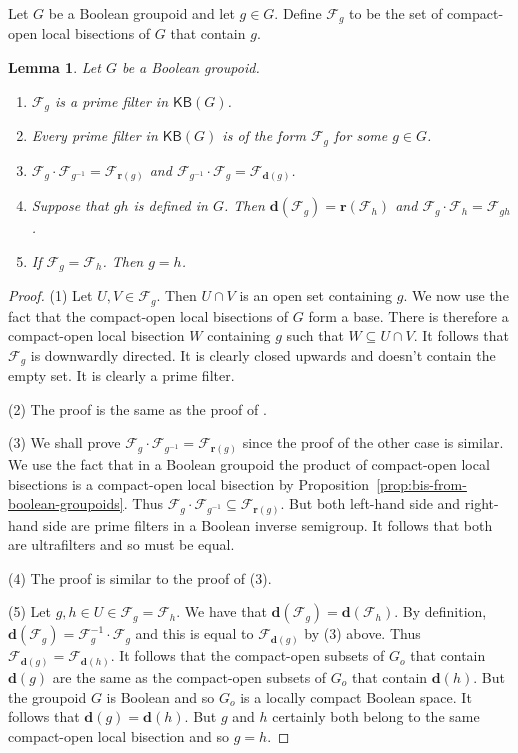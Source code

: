 \documentclass[a4paper]{amsart}
\newtheorem{lemma}[theorem]{Lemma}
\begin{document}
Let $G$ be a Boolean groupoid and let $g \in G$.
Define $\mathscr{F}_{g}$ to be the set of compact-open local bisections of $G$ that contain $g$.


\begin{lemma}\label{lem:compact-open-prime} Let $G$ be a Boolean groupoid.
\begin{enumerate}
\item $\mathscr{F}_{g}$ is a prime filter in $\mathsf{KB}(G)$.
\item Every prime filter in $\mathsf{KB}(G)$ is of the form $\mathscr{F}_{g}$ for some $g \in G$.
\item $\mathscr{F}_{g} \cdot \mathscr{F}_{g^{-1}} = \mathscr{F}_{\mathbf{r}(g)}$
and
$\mathscr{F}_{g^{-1}} \cdot \mathscr{F}_{g} = \mathscr{F}_{\mathbf{d}(g)}$.
\item Suppose that $gh$ is defined in $G$. 
Then
$\mathbf{d}(\mathscr{F}_{g}) = \mathbf{r}(\mathscr{F}_{h})$
and 
$\mathscr{F}_{g} \cdot \mathscr{F}_{h} = \mathscr{F}_{gh}$.
\item If $\mathscr{F}_{g} = \mathscr{F}_{h}$. Then $g = h$.
\end{enumerate}
\end{lemma}
\begin{proof}
(1) Let $U, V \in \mathscr{F}_{g}$.
Then $U \cap V$ is an open set containing $g$.
We now use the fact that the compact-open local bisections of $G$ form a base.
There is therefore a compact-open local bisection $W$ containing $g$ such that $W \subseteq U \cap V$.
It follows that $\mathscr{F}_{g}$ is downwardly directed.
It is clearly closed upwards and doesn't contain the empty set.
It is clearly a prime filter.

(2) The proof is the same as the proof of \cite[part (5) of Lemma 2.19]{Lawson3}.

(3) We shall prove 
$\mathscr{F}_{g} \cdot \mathscr{F}_{g^{-1}} = \mathscr{F}_{\mathbf{r}(g)}$
since the proof of the other case is similar.
We use the fact that in a Boolean groupoid the product of compact-open local
bisections is a compact-open local bisection by Proposition~\ref{prop:bis-from-boolean-groupoids}.
Thus 
$\mathscr{F}_{g} \cdot \mathscr{F}_{g^{-1}} \subseteq \mathscr{F}_{\mathbf{r}(g)}$.
But both left-hand side and right-hand side are prime filters
in a Boolean inverse semigroup.
It follows that both are ultrafilters and so must be equal.

(4) The proof is similar to the proof of (3).

(5) Let $g,h \in U \in \mathscr{F}_{g} = \mathscr{F}_{h}$.
We have that 
$\mathbf{d}(\mathscr{F}_{g}) = \mathbf{d}(\mathscr{F}_{h})$.
By definition, $\mathbf{d}(\mathscr{F}_{g}) = \mathscr{F}_{g}^{-1} \cdot \mathscr{F}_{g}$
and this is equal to $\mathscr{F}_{\mathbf{d}(g)}$ by (3) above.
Thus 
$\mathscr{F}_{\mathbf{d}(g)} = \mathscr{F}_{\mathbf{d}(h)}$.
It follows that the compact-open subsets of $G_{o}$ that contain $\mathbf{d}(g)$
are the same as the compact-open subsets of $G_{o}$ that contain $\mathbf{d}(h)$.
But the groupoid $G$ is Boolean and so $G_{o}$ is a locally compact Boolean space.
It follows that $\mathbf{d}(g) = \mathbf{d}(h)$.
But $g$ and $h$ certainly both belong to the same compact-open local bisection
and so $g = h$. 
\end{proof}
\end{document}
